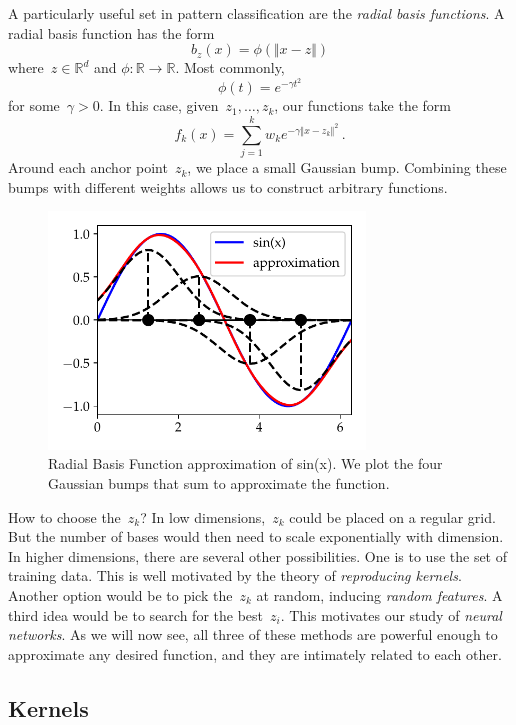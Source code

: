 \documentclass{tufte-book}
\begin{document}
A particularly useful set in pattern classification are the \emph{radial
basis functions}. A radial basis function has the form \[
    b_z(x) = \phi( \Vert x-z \Vert)
\] where~\(z \in \mathbb{R}^d\) and
\(\phi:\mathbb{R}\rightarrow\mathbb{R}\). Most commonly, \[
    \phi(t) = e^{-\gamma t^2}
\] for some~\(\gamma>0\). In this case, given~\(z_1,\ldots, z_k\), our
functions take the form \[
    f_k(x) = \sum_{j=1}^k w_k  e^{-\gamma \Vert x-z_k \Vert^2}\,.
\] Around each anchor point~\(z_k\), we place a small Gaussian bump.
Combining these bumps with different weights allows us to construct
arbitrary functions.

\begin{figure}
\centering
\includegraphics[width=0.75\textwidth,height=\textheight]{assets/rbf_approximation}
\caption{Radial Basis Function approximation of sin(x). We plot the four
Gaussian bumps that sum to approximate the function.}
\end{figure}

How to choose the~\(z_k\)? In low dimensions,~\(z_k\) could be placed on
a regular grid. But the number of bases would then need to scale
exponentially with dimension. In higher dimensions, there are several
other possibilities. One is to use the set of training data. This is
well motivated by the theory of \emph{reproducing kernels}. Another
option would be to pick the~\(z_k\) at random, inducing \emph{random
features}. A third idea would be to search for the best~\(z_i\). This
motivates our study of \emph{neural networks}. As we will now see, all
three of these methods are powerful enough to approximate any desired
function, and they are intimately related to each other.

\hypertarget{kernels}{%
\subsection{Kernels}\label{kernels}}
\end{document}
